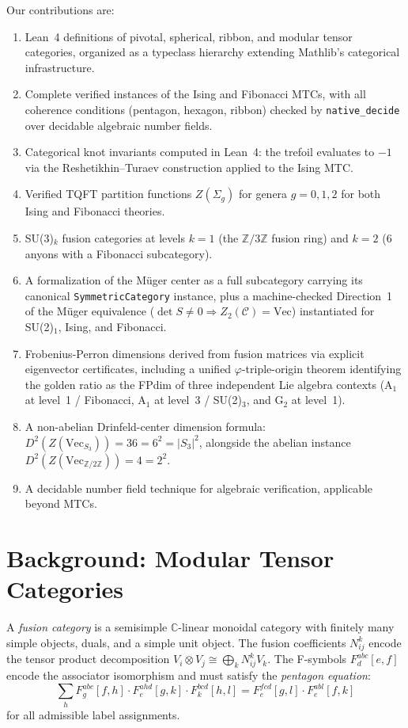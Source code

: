 \documentclass[12pt]{article}
\newcommand{\nativedecide}{\texttt{native\_decide}}
\newcommand{\Zn}[1]{\mathbb{Z}/#1\mathbb{Z}}
\begin{document}
Our contributions are:
\begin{enumerate}
\item Lean~4 definitions of pivotal, spherical, ribbon, and modular tensor categories, organized as a typeclass hierarchy extending Mathlib's categorical infrastructure.
\item Complete verified instances of the Ising and Fibonacci MTCs, with all coherence conditions (pentagon, hexagon, ribbon) checked by \nativedecide{} over decidable algebraic number fields.
\item Categorical knot invariants computed in Lean~4: the trefoil evaluates to $-1$ via the Reshetikhin--Turaev construction applied to the Ising MTC.
\item Verified TQFT partition functions $Z(\Sigma_g)$ for genera $g = 0, 1, 2$ for both Ising and Fibonacci theories.
\item SU(3)$_k$ fusion categories at levels $k=1$ (the $\Zn{3}$ fusion ring) and $k=2$ (6 anyons with a Fibonacci subcategory).
\item A formalization of the Müger center as a full subcategory carrying its canonical \texttt{SymmetricCategory} instance, plus a machine-checked Direction~1 of the Müger equivalence ($\det S \neq 0 \Rightarrow Z_2(\mathcal{C}) = \mathrm{Vec}$) instantiated for SU(2)$_1$, Ising, and Fibonacci.
\item Frobenius-Perron dimensions derived from fusion matrices via explicit eigenvector certificates, including a unified $\varphi$-triple-origin theorem identifying the golden ratio as the FPdim of three independent Lie algebra contexts (A$_1$ at level~1 / Fibonacci, A$_1$ at level~3 / SU(2)$_3$, and G$_2$ at level~1).
\item A non-abelian Drinfeld-center dimension formula: $D^2(Z(\mathrm{Vec}_{S_3})) = 36 = 6^2 = |S_3|^2$, alongside the abelian instance $D^2(Z(\mathrm{Vec}_{\Zn{2}})) = 4 = 2^2$.
\item A decidable number field technique for algebraic verification, applicable beyond MTCs.
\end{enumerate}

\section{Background: Modular Tensor Categories}
\label{sec:background}

A \emph{fusion category} is a semisimple $\mathbb{C}$-linear monoidal category with finitely many simple objects, duals, and a simple unit object. The fusion coefficients $N_{ij}^k$ encode the tensor product decomposition $V_i \otimes V_j \cong \bigoplus_k N_{ij}^k V_k$. The F-symbols $F^{abc}_{d}[e,f]$ encode the associator isomorphism and must satisfy the \emph{pentagon equation}:
\begin{equation}\label{eq:pentagon}
\sum_h F^{abc}_{g}[f,h] \cdot F^{ahd}_{e}[g,k] \cdot F^{bcd}_{k}[h,l] = F^{fcd}_{e}[g,l] \cdot F^{abl}_{e}[f,k]
\end{equation}
for all admissible label assignments.
\end{document}
